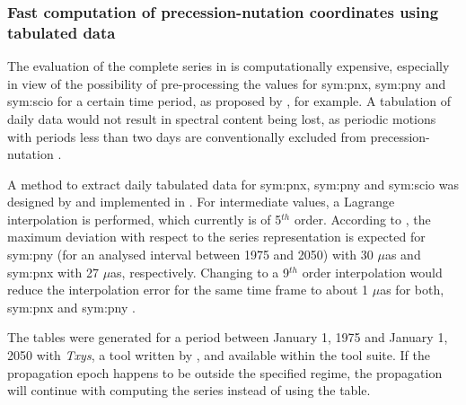 \subsubsection{Fast computation of precession-nutation coordinates using tabulated data}
\label{sec:pn-tabulation}

The evaluation of the complete series in  is computationally expensive, especially in view of the possibility of pre-processing the values for 
\gls{sym:pnx}, \gls{sym:pny} and \gls{sym:scio} for a certain time period, as proposed by \citet{coppola2009}, for example. A tabulation of daily data would not result in 
spectral content being lost, as periodic motions with periods less than two days are conventionally excluded from precession-nutation \citep{coppola2009}.

A method to extract daily tabulated data for \gls{sym:pnx}, \gls{sym:pny} and \gls{sym:scio} was designed by \citet{lange2014} and implemented in \neptune. For intermediate 
values, a Lagrange interpolation is performed, which currently is of 5$^{th}$ order. According to \citet{coppola2009}, the maximum deviation with respect to the series 
representation is expected for \gls{sym:pny} (for an analysed interval between \num{1975} and \num{2050}) with \num{30} $\mu$as and \gls{sym:pnx} with \num{27} $\mu$as, respectively. 
Changing to a 9$^{th}$ order interpolation would reduce the interpolation error for the same time frame to about \num{1} $\mu$as for both, \gls{sym:pnx} and \gls{sym:pny}
\citep{coppola2009}.

The tables were generated for a period between January 1, 1975 and January 1, 2050 with \textit{Txys}, a tool written by \citet{lange2014}, and available within the \neptune tool
suite. If the propagation epoch happens to be outside the specified regime, the propagation will continue with computing the series instead of using the table.

